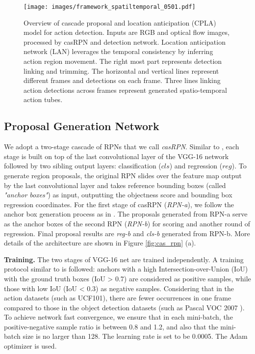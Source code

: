 \documentclass{bmvc2k}
\begin{document}
\begin{figure}
\centering
\texttt{[image: images/framework\_spatiltemporal\_0501.pdf]}
\caption{Overview of cascade proposal and location anticipation (CPLA) model for action detection. Inputs are RGB and optical flow images, processed by casRPN and detection network. Location anticipation network (LAN) leverages the temporal consistency by inferring action region movement. The right most part represents detection linking and trimming. The horizontal and vertical lines represent different frames and detections on each frame. Three lines linking action detections across frames represent generated spatio-temporal action tubes.}
\label{fig:overview}
\end{figure}

\subsection{Proposal Generation Network}
\label{casRPN}
We adopt a two-stage cascade of RPNs \cite{ren2015faster} that we call \textit{casRPN}. Similar to \cite{ren2015faster}, each stage is built on top of the last convolutional layer of the VGG-16 network \cite{simonyan2014very} followed by two sibling output layers: classification ($cls$) and regression ($reg$). To generate region proposals, the original RPN slides over the feature map output by the last convolutional layer and takes reference bounding boxes (called \textit{"anchor boxes"}) as input, outputting the objectness score and bounding box regression coordinates. For the first stage of casRPN (\textit{RPN-a}), we follow the anchor box generation process as in \cite{ren2015faster}. The proposals generated from RPN-a serve as the anchor boxes of the second RPN (\textit{RPN-b}) for scoring and another round of regression. Final proposal results are \textit{reg-b} and \textit{cls-b} generated from RPN-b. More details of the architecture are shown in Figure \ref{fig:cas_rpn} (a).



\textbf{Training.} The two stages of VGG-16 net are trained independently. A training protocol similar to \cite{ren2015faster} is followed: anchors with a high Intersection-over-Union (IoU) with the ground truth boxes (IoU > 0.7) are considered as positive samples, while those with low IoU (IoU < 0.3) as negative samples. Considering that in the action datasets (such as UCF101), there are fewer occurrences in one frame compared to those in the object detection datasets (such as Pascal VOC 2007 \cite{pascal-voc-2007}). 
To achieve network fast convergence, we ensure that in each mini-batch, the positive-negative sample ratio is between 0.8 and 1.2, and also that the mini-batch size is no larger than 128. The learning rate is set to be 0.0005. The Adam \cite{kingma2014adam} optimizer is used.  
\end{document}
